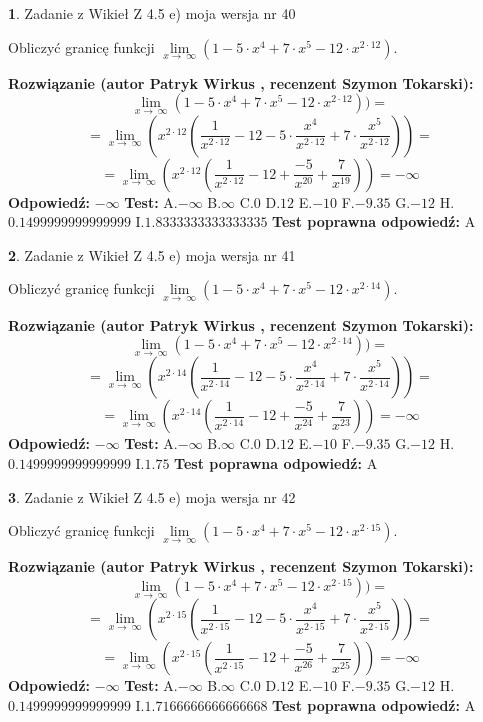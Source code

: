 \documentclass[12pt, a4paper]{article}
\theoremstyle{definition} %
\newtheorem{zad}{}
\newcommand{\zadStart}[1]{\begin{zad}#1\newline}
\newcommand{\zadStop}{\end{zad}}
\newcommand{\rozwStart}[2]{\noindent \textbf{Rozwiązanie (autor #1 , recenzent #2): }\newline}
\newcommand{\rozwStop}{\newline}
\newcommand{\odpStart}{\noindent \textbf{Odpowiedź:}\newline}
\newcommand{\odpStop}{\newline}
\newcommand{\testStart}{\noindent \textbf{Test:}\newline}
\newcommand{\testStop}{\newline}
\newcommand{\kluczStart}{\noindent \textbf{Test poprawna odpowiedź:}\newline}
\newcommand{\kluczStop}{\newline}
\begin{document}
\zadStart{Zadanie z Wikieł Z 4.5 e) moja wersja nr 40}


Obliczyć granicę funkcji  $\lim\limits_{x\to\ \infty}(1 - 5 \cdot x^{4}+7 \cdot x^{5}- 12 \cdot x^{2\cdot12})$.
\zadStop
\rozwStart{Patryk Wirkus}{Szymon Tokarski}
$$\lim\limits_{x\to\ \infty}(1 - 5 \cdot x^{4}+7 \cdot x^{5}- 12 \cdot x^{2\cdot12}))=$$
$$=\lim\limits_{x\to\ \infty}(x^{2\cdot12}(\frac{1}{x^{2\cdot12}}-12 -5 \cdot \frac{x^{4}}{x^{2\cdot12}}+7 \cdot \frac{x^{5}}{x^{2\cdot12}}))=$$
$$=\lim\limits_{x\to\ \infty}(x^{2\cdot12}(\frac{1}{x^{2\cdot12}}-12 + \frac{-5}{x^{20}}+ \frac{7}{x^{19}}))=-\infty$$
\rozwStop
\odpStart
$-\infty$
\odpStop
\testStart
A.$-\infty$ B.$\infty$ C.$0$ D.$12$ E.$-10$
F.$-9.35$ G.$-12$
H.$0.1499999999999999$
I.$1.8333333333333335$
\testStop
\kluczStart
A
\kluczStop



\zadStart{Zadanie z Wikieł Z 4.5 e) moja wersja nr 41}


Obliczyć granicę funkcji  $\lim\limits_{x\to\ \infty}(1 - 5 \cdot x^{4}+7 \cdot x^{5}- 12 \cdot x^{2\cdot14})$.
\zadStop
\rozwStart{Patryk Wirkus}{Szymon Tokarski}
$$\lim\limits_{x\to\ \infty}(1 - 5 \cdot x^{4}+7 \cdot x^{5}- 12 \cdot x^{2\cdot14}))=$$
$$=\lim\limits_{x\to\ \infty}(x^{2\cdot14}(\frac{1}{x^{2\cdot14}}-12 -5 \cdot \frac{x^{4}}{x^{2\cdot14}}+7 \cdot \frac{x^{5}}{x^{2\cdot14}}))=$$
$$=\lim\limits_{x\to\ \infty}(x^{2\cdot14}(\frac{1}{x^{2\cdot14}}-12 + \frac{-5}{x^{24}}+ \frac{7}{x^{23}}))=-\infty$$
\rozwStop
\odpStart
$-\infty$
\odpStop
\testStart
A.$-\infty$ B.$\infty$ C.$0$ D.$12$ E.$-10$
F.$-9.35$ G.$-12$
H.$0.1499999999999999$
I.$1.75$
\testStop
\kluczStart
A
\kluczStop



\zadStart{Zadanie z Wikieł Z 4.5 e) moja wersja nr 42}


Obliczyć granicę funkcji  $\lim\limits_{x\to\ \infty}(1 - 5 \cdot x^{4}+7 \cdot x^{5}- 12 \cdot x^{2\cdot15})$.
\zadStop
\rozwStart{Patryk Wirkus}{Szymon Tokarski}
$$\lim\limits_{x\to\ \infty}(1 - 5 \cdot x^{4}+7 \cdot x^{5}- 12 \cdot x^{2\cdot15}))=$$
$$=\lim\limits_{x\to\ \infty}(x^{2\cdot15}(\frac{1}{x^{2\cdot15}}-12 -5 \cdot \frac{x^{4}}{x^{2\cdot15}}+7 \cdot \frac{x^{5}}{x^{2\cdot15}}))=$$
$$=\lim\limits_{x\to\ \infty}(x^{2\cdot15}(\frac{1}{x^{2\cdot15}}-12 + \frac{-5}{x^{26}}+ \frac{7}{x^{25}}))=-\infty$$
\rozwStop
\odpStart
$-\infty$
\odpStop
\testStart
A.$-\infty$ B.$\infty$ C.$0$ D.$12$ E.$-10$
F.$-9.35$ G.$-12$
H.$0.1499999999999999$
I.$1.7166666666666668$
\testStop
\kluczStart
A
\kluczStop
\end{document}
